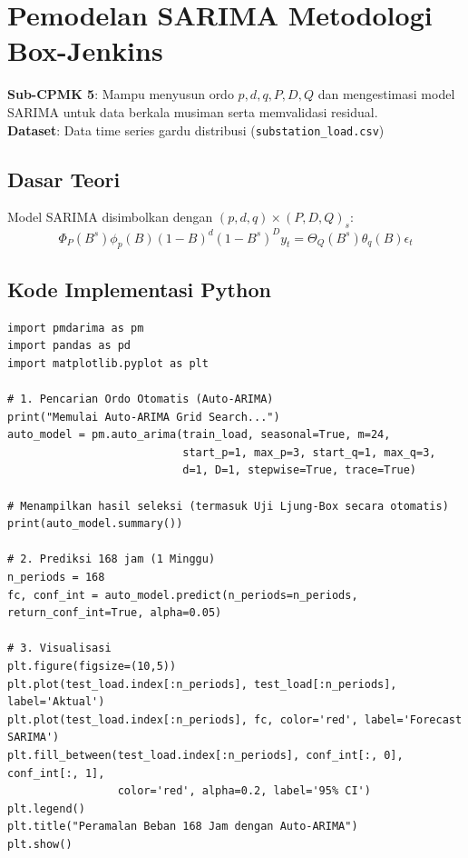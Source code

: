 \documentclass[11pt,a4paper]{report}
\begin{document}
\chapter{Pemodelan SARIMA Metodologi Box-Jenkins}

\begin{tcolorbox}[title=Informasi Modul 5]
\textbf{Sub-CPMK 5}: Mampu menyusun ordo $p, d, q, P, D, Q$ dan mengestimasi model SARIMA untuk data berkala musiman serta memvalidasi residual.\\
\textbf{Dataset}: Data time series gardu distribusi (\texttt{substation\_load.csv})
\end{tcolorbox}

\section{Dasar Teori}
Model SARIMA disimbolkan dengan $(p,d,q) \times (P,D,Q)_s$:
\begin{equation}
    \Phi_P(B^s)\phi_p(B)(1-B)^d(1-B^s)^D y_t = \Theta_Q(B^s)\theta_q(B)\epsilon_t
\end{equation}

\section{Kode Implementasi Python}
\begin{lstlisting}
import pmdarima as pm
import pandas as pd
import matplotlib.pyplot as plt

# 1. Pencarian Ordo Otomatis (Auto-ARIMA)
print("Memulai Auto-ARIMA Grid Search...")
auto_model = pm.auto_arima(train_load, seasonal=True, m=24,
                           start_p=1, max_p=3, start_q=1, max_q=3,
                           d=1, D=1, stepwise=True, trace=True)

# Menampilkan hasil seleksi (termasuk Uji Ljung-Box secara otomatis)
print(auto_model.summary())

# 2. Prediksi 168 jam (1 Minggu)
n_periods = 168
fc, conf_int = auto_model.predict(n_periods=n_periods, return_conf_int=True, alpha=0.05)

# 3. Visualisasi
plt.figure(figsize=(10,5))
plt.plot(test_load.index[:n_periods], test_load[:n_periods], label='Aktual')
plt.plot(test_load.index[:n_periods], fc, color='red', label='Forecast SARIMA')
plt.fill_between(test_load.index[:n_periods], conf_int[:, 0], conf_int[:, 1], 
                 color='red', alpha=0.2, label='95% CI')
plt.legend()
plt.title("Peramalan Beban 168 Jam dengan Auto-ARIMA")
plt.show()
\end{lstlisting}
\end{document}

